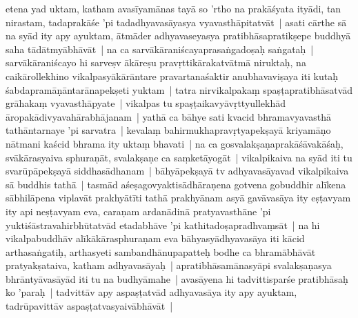 \documentclass[article,12pt,a4paper]{memoir}%
\newcounter{parCount}
\begin{document}
	  
	  \pstart \leavevmode%
	\label{thakur75-140.12}etena yad uktam, katham avasīyamānas \label{ratnakīrtinibandhāvali__36r1PF7IMRL3AMLSE72I8R6WZC0}tayā so 'rtho\label{ratnakīrtinibandhāvali__36r1PF7IMRIYIIGI4TNLZD3AB1C} na prakāśyata ityādi, tan nirastam, tadaprakāśe 'pi tadadhyavasāyasya vyavasthāpitatvāt | asati cārthe sā na syād ity apy ayuktam, ātmāder adhyavaseyasya pratibhāsapratikṣepe buddhyā saha tādātmyābhāvāt | na ca sarvākāraniścayaprasaṅgadoṣaḥ saṅgataḥ | sarvākāraniścayo hi sarveṣv ākāreṣu pravṛttikārakatvātmā niruktaḥ, na caikārollekhino vikalpasyākārāntare pravartanaśaktir anubhavaviṣaya iti kutaḥ śabdapramāṇāntarānapekṣeti yuktam | tatra nirvikalpakaṃ spaṣṭapratibhāsatvād grāhakaṃ vyavasthāpyate | vikalpas tu spaṣṭaikavyāvṛttyullekhād āropakādivyavahārabhājanam | yathā ca bāhye sati kvacid bhramavyavasthā tathāntarnaye 'pi sarvatra | kevalaṃ bahirmukhapravṛtyapekṣayā kriyamāṇo nātmani kaścid bhrama ity uktaṃ bhavati | na ca gosvalakṣaṇaprakāśāvakāśaḥ, svākārasyaiva sphuraṇāt, svalakṣaṇe ca saṃketāyogāt | vikalpikaiva na syād iti tu svarūpāpekṣayā siddhasādhanam | bāhyāpekṣayā tv adhyavasāyavad vikalpikaiva sā buddhis tathā | tasmād aśeṣagovyaktisādhāraṇena gotvena gobuddhir alīkena sābhilāpena viplavāt prakhyātīti tathā prakhyānam asyā gavāvasāya ity eṣṭavyam ity api neṣṭavyam eva, caraṇam ardanādinā pratyavasthāne 'pi yuktiśāstravahirbhūtatvād etadabhāve 'pi kathitadoṣapradhvaṃsāt | na hi vikalpabuddhāv alīkākārasphuraṇam eva bāhyasyādhyavasāya iti kācid arthasaṅgatiḥ, arthasyeti sambandhānupapatteḥ \label{ratnakīrtinibandhāvali__36r1PF7IMRGUOJ6VH79IC2IAM5I}bodhe ca bhramābhāvāt\label{ratnakīrtinibandhāvali__36r1PF7IMREQOM5KKKSKN74E0AR} pratyakṣataiva, katham adhyavasāyaḥ | apratibhāsamānasyāpi svalakṣaṇasya bhrāntyāvasāyād iti tu na budhyāmahe | avasāyena hi tadvittisparśe pratibhāsaḥ ko 'paraḥ | tadvittāv apy aspaṣṭatvād adhyavasāya ity apy ayuktam, tadrūpavittāv aspaṣṭatvasyaivābhāvāt |
	{}
	\pend%
      
\end{document}
